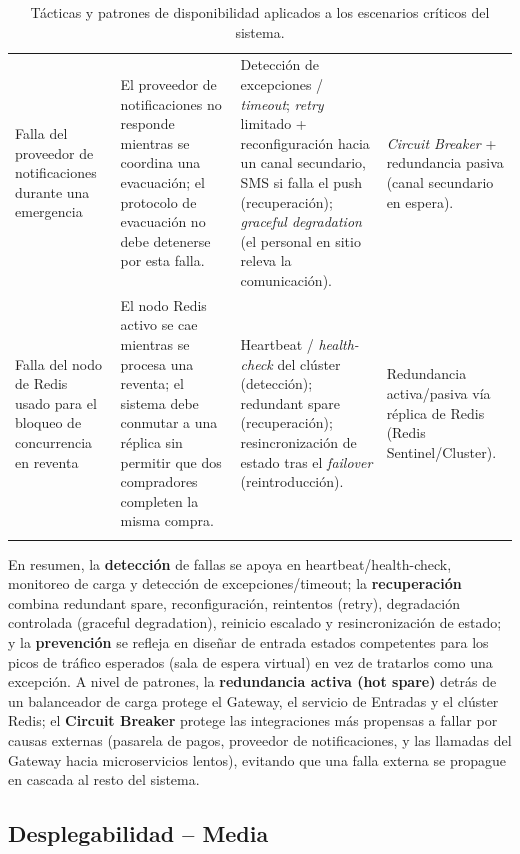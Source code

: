 \documentclass[12pt,a4paper]{article}
\begin{document}
\begin{center}
\begin{longtable}{p{2.6cm}p{4.7cm}p{3.6cm}p{2.9cm}}
Falla del proveedor de notificaciones durante una emergencia &
El proveedor de notificaciones no responde mientras se coordina una evacuación; el protocolo de
evacuación no debe detenerse por esta falla. &
Detección de excepciones / \textit{timeout}; \textit{retry} limitado + reconfiguración hacia un
canal secundario, SMS si falla el push (recuperación); \textit{graceful degradation} (el personal
en sitio releva la comunicación). &
\textit{Circuit Breaker} + redundancia pasiva (canal secundario en espera).\\[0.5em]

Falla del nodo de Redis usado para el bloqueo de concurrencia en reventa &
El nodo Redis activo se cae mientras se procesa una reventa; el sistema debe conmutar a una
réplica sin permitir que dos compradores completen la misma compra. &
Heartbeat / \textit{health-check} del clúster (detección); redundant spare (recuperación);
resincronización de estado tras el \textit{failover} (reintroducción). &
Redundancia activa/pasiva vía réplica de Redis (Redis Sentinel/Cluster).\\
\bottomrule
\caption{Tácticas y patrones de disponibilidad aplicados a los escenarios críticos del sistema.}
\label{tab:tacticas-disponibilidad}
\end{longtable}
\end{center}

En resumen, la \textbf{detección} de fallas se apoya en heartbeat/health-check, monitoreo de
carga y detección de excepciones/timeout; la \textbf{recuperación} combina redundant spare,
reconfiguración, reintentos (retry), degradación controlada (graceful degradation), reinicio
escalado y resincronización de estado; y la \textbf{prevención} se refleja en diseñar de entrada
estados competentes para los picos de tráfico esperados (sala de espera virtual) en vez de
tratarlos como una excepción. A nivel de patrones, la \textbf{redundancia activa (hot spare)}
detrás de un balanceador de carga protege el Gateway, el servicio de Entradas y el clúster Redis;
el \textbf{Circuit Breaker} protege las integraciones más propensas a fallar por causas externas
(pasarela de pagos, proveedor de notificaciones, y las llamadas del Gateway hacia microservicios
lentos), evitando que una falla externa se propague en cascada al resto del sistema.

\subsection{Desplegabilidad -- Media}
\end{document}
